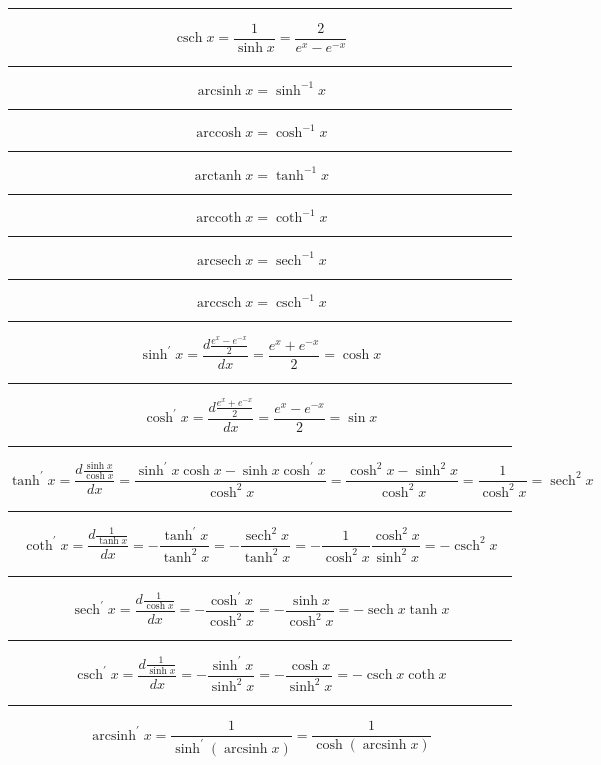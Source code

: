 \documentclass[a0paper,landscape,fleqn]{article}
\DeclareMathOperator{\sech}{sech}
\DeclareMathOperator{\csch}{csch}
\DeclareMathOperator{\arcsinh}{arcsinh}
\DeclareMathOperator{\arccosh}{arccosh}
\DeclareMathOperator{\arctanh}{arctanh}
\DeclareMathOperator{\arccoth}{arccoth}
\DeclareMathOperator{\arcsech}{arcsech}
\DeclareMathOperator{\arccsch}{arccsch}
\begin{document}
\hrule
\begin{equation*}
\csch x=\frac{1}{\sinh x}=\frac{2}{e^x-e^{-x}}
\end{equation*}
\hrule
\begin{equation*}
\arcsinh x=\sinh^{-1} x
\end{equation*}
\hrule
\begin{equation*}
\arccosh x=\cosh^{-1} x
\end{equation*}
\hrule
\begin{equation*}
\arctanh x=\tanh^{-1} x
\end{equation*}
\hrule
\begin{equation*}
\arccoth x=\coth^{-1} x
\end{equation*}
\hrule
\begin{equation*}
\arcsech x=\sech^{-1} x
\end{equation*}
\hrule
\begin{equation*}
\arccsch x=\csch^{-1} x
\end{equation*}
\hrule
\begin{equation*}
\sinh^\prime x
=\frac{d\frac{e^x-e^{-x}}{2}}{dx}
=\frac{e^x+e^{-x}}{2}
=\cosh x
\end{equation*}
\hrule
\begin{equation*}
\cosh^\prime x
=\frac{d\frac{e^x+e^{-x}}{2}}{dx}
=\frac{e^x-e^{-x}}{2}
=\sin x
\end{equation*}
\hrule
\begin{equation*}
\tanh^\prime x
=\frac{d\frac{\sinh x}{\cosh x}}{dx}
=\frac{\sinh^\prime x\cosh x-\sinh x\cosh^\prime x}{\cosh^2 x}
=\frac{\cosh^2 x-\sinh^2 x}{\cosh^2 x}
=\frac{1}{\cosh^2 x}
=\sech^2 x
\end{equation*}
\hrule
\begin{equation*}
\coth^\prime x
=\frac{d\frac{1}{\tanh x}}{dx}
=-\frac{\tanh^\prime x}{\tanh^2 x}
=-\frac{\sech^2 x}{\tanh^2 x}
=-\frac{1}{\cosh^2 x}\frac{\cosh^2 x}{\sinh^2 x}=-\csch^2 x
\end{equation*}
\hrule
\begin{equation*}
\sech^\prime x
=\frac{d\frac{1}{\cosh x}}{dx}
=-\frac{\cosh^\prime x}{\cosh^2 x}
=-\frac{\sinh x}{\cosh^2 x}
=-\sech x\tanh x
\end{equation*}
\hrule
\begin{equation*}
\csch^\prime x
=\frac{d\frac{1}{\sinh x}}{dx}
=-\frac{\sinh^\prime x}{\sinh^2 x}
=-\frac{\cosh x}{\sinh^2 x}
=-\csch x\coth x
\end{equation*}
\hrule
\begin{equation*}
\arcsinh^\prime x
=\frac{1}{\sinh^\prime(\arcsinh x)}
=\frac{1}{\cosh(\arcsinh x)}
\end{equation*}
\end{document}
